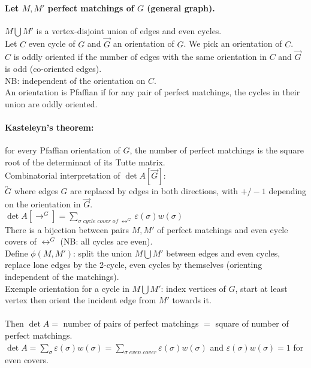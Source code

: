 \documentclass[12pt]{article}
\begin{document}
\paragraph{Let $M,M'$ perfect matchings of $G$ (general graph).} $M \bigcup M'$ is a vertex-disjoint union of edges and even cycles.\\
Let $C$ even cycle of $G$ and $\overrightarrow{G}$ an orientation of $G$. We pick an orientation of $C$.\\
$C$ is oddly oriented if the number of edges with the same orientation in $C$ and $\overrightarrow{G}$ is odd (co-oriented edges).\\
NB: independent of the orientation on $C$.\\
An orientation is Pfaffian if for any pair of perfect matchings, the cycles in their union are oddly oriented.\\

\paragraph{Kasteleyn's theorem:} for every Pfaffian orientation of $G$, the number of perfect matchings is the square root of the determinant of its Tutte matrix.\\
Combinatorial interpretation of  $\det A[\overrightarrow{G}]$:\\
$\overleftrightarrow{G}$ where edges $G$ are replaced by edges in both directions, with $+/- 1$ depending on the orientation in $\overrightarrow{G}$.\\
$\det A[\rightarrow^{G}] = \sum_{\sigma \; cycle \; cover \; of \; \leftrightarrow^{G}} \varepsilon(\sigma) w(\sigma)$\\
There is a bijection between pairs $M,M'$ of perfect matchings and even cycle covers of $\leftrightarrow^{G}$ (NB: all cycles are even).\\
Define $\phi(M,M')$: split the union $M \bigcup M'$ between edges and even cycles, replace lone edges by the 2-cycle, even cycles by themselves (orienting independent of the matchings).\\
Exemple orientation for a cycle in $M \bigcup M'$: index vertices of $G$, start at least vertex then orient the incident edge from $M'$ towards it.\\\\

Then $\det A =$ number of pairs of perfect matchings $=$ square of number of perfect matchings.\\
$\det A = \sum_\sigma \varepsilon(\sigma) w(\sigma) = \sum_{\sigma \; even \; cover} \varepsilon(\sigma) w(\sigma)$ and $\varepsilon(\sigma) w(\sigma) = 1$ for even covers.\\
\end{document}

